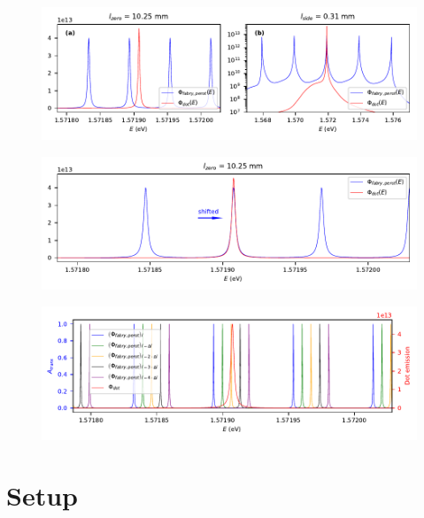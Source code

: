 \begin{figure}[H]
	\centering
	\includegraphics[width=\linewidth]{figures/fabry-perot/plots/simulation-comparison-dot-fabry-perot-output}
	\caption{}
	\label{fig:simulation-comparison-dot-fabry-perot-output}
\end{figure}

\begin{figure}[H]
	\centering
	\includegraphics[width=\linewidth]{figures/fabry-perot/plots/simulation-comparison-dot-fabry-perot-output-shifted}
	\caption{}
	\label{fig:simulation-comparison-dot-fabry-perot-output-shifted}
\end{figure}

\begin{figure}[H]
	\centering
	\includegraphics[width=\linewidth]{figures/fabry-perot/plots/simulation-comparison-dot-fabry-perot-sweep}
	\caption{}
	\label{fig:simulation-comparison-dot-fabry-perot-sweep}
\end{figure}

\section{Setup}

